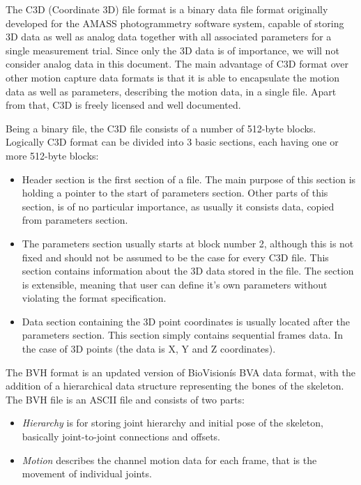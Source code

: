 \documentclass[times, 10pt,twocolumn]{article}
\begin{document}
The C3D (Coordinate 3D) file format is a binary data file format originally developed for the AMASS photogrammetry software system, capable of storing 3D data as well as analog data together with all associated parameters for a single measurement trial. Since only the 3D data is of importance, we will not consider analog data in this document. The main advantage of C3D format over other motion capture data formats is that it is able to encapsulate the motion data as well as parameters, describing the  motion data, in a single file. Apart from that, C3D is freely licensed and well documented.

Being a binary file, the C3D file consists of a number of 512-byte blocks. Logically C3D format can be divided into 3 basic sections, each having one or more 512-byte blocks:
\begin{itemize}
\item Header section is the first section of a file. The main purpose of this section is holding a pointer to the start of parameters section. Other parts of this section, is of no particular importance, as usually it consists data, copied from parameters section.

\item The parameters section usually starts at block number 2, although this is not fixed and should not be assumed to be the case for every C3D file. This section contains information about the 3D data stored in the file. The section is extensible, meaning that user can define it's own parameters without  violating the format specification.

\item Data section containing the 3D point coordinates is usually located after the parameters section. This section simply contains sequential frames data. In the case of 3D points (the data is X, Y and Z coordinates).
\end{itemize}

\label{bvh_description}
The BVH format is an updated version of BioVisionís BVA data format, with the addition of a
hierarchical data structure representing the bones of the skeleton.
The BVH file is an ASCII file and consists of two parts:

\begin{itemize}
\item \emph{Hierarchy} is for storing joint hierarchy and initial pose of the skeleton,
basically joint-to-joint connections and offsets.
\item \emph{Motion} describes the channel motion data for each frame,
that is the movement of individual joints.
\end{itemize}
\end{document}
